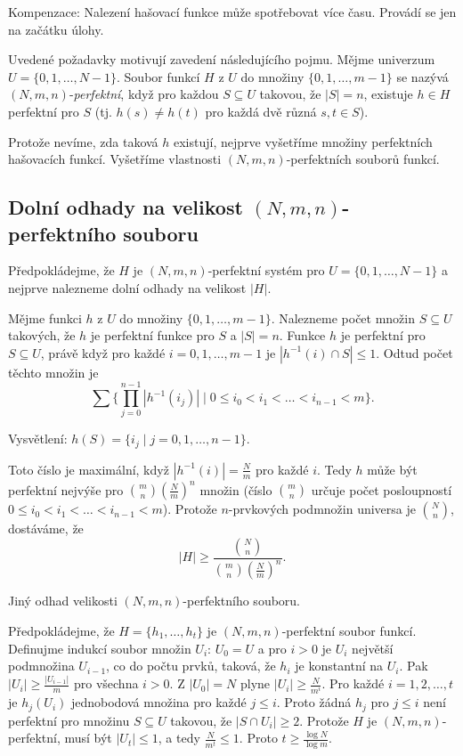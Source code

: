 \documentclass[a4paper,12pt]{article}
\begin{document}
Kompenzace: Nalezení hašovací funkce 
může spotřebovat více času. Provádí se jen na 
začátku úlohy. 

Uvedené požadavky motivují zavedení 
následujícího pojmu.\newline 
Mějme univerzum $U=\{0,1,\dots,N-1\}$. Soubor funkcí $H$ z 
$U$ do množiny $\{0,1,\dots,m-1\}$ se nazývá 
$(N,m,n)$-\emph{perfektní}, když pro každou $S\subseteq 
U$ 
takovou, že $|S|=n$, existuje $h\in H$ perfektní pro $S$ (tj. 
$h(s)\ne h(t)$ pro každá dvě různá $s,t\in S$).

Protože nevíme, zda taková $h$ existují, nejprve 
vyšetříme mno\-ži\-ny perfektních hašovacích 
funkcí. Vyšetříme vlastnosti $(N,m,n)$-perfektních 
souborů funkcí.

\subsection{
Dolní odhady na velikost $(N,m,n)$-perfektního souboru
}

Předpokládejme, že $H$  je $(N,m,n)$-perfektní 
systém pro $U=\{0,1,\dots,N-1\}$ a nejprve nalezneme dolní 
odhady na velikost $|H|$.

Mějme funkci $h$ z $U$ do množiny $\{0,1,\dots,m-
1\}$. 
Nalezneme počet množin $S\subseteq U$ takových, že  
$h$ je perfektní funkce pro $S$ a $|S|=n$. Funkce $h$ je perfektní pro 
$S\subseteq U$, právě když pro každé $i=0,1,\dots,m-
1$ je 
$|h^{-1}(i)\cap S|\le 1$. Odtud počet těchto množin je
$$\sum \{\prod_{j=0}^{n-1}|h^{-1}(i_j)|\mid 0\le i_0<i_1<\dots<i_{
n-1}<m\}.$$

Vysvětlení: $h(S)=\{i_j\mid j=0,1,\dots,n-1\}$.

Toto číslo je maximální, když $|h^{-1}(
i)|=\frac Nm$ pro každé $i$. 
Tedy $h$ může být perfektní nejvýše pro $\binom 
mn(\frac Nm)^n$ 
množin (číslo $\binom mn$ určuje počet posloupností 
$0\le i_0<i_1<\dots<i_{n-1}<m$). Protože $n$-prvkových 
podmnožin universa je $\binom Nn$, dostáváme, že 
$$|H|\ge\frac {\binom Nn}{\binom mn(\frac Nm)^n}.$$

Jiný odhad velikosti $(N,m,n)$-perfektního souboru.

Předpokládejme, že $H=\{h_1,\dots,h_t\}$ je 
$(N,m,n)$-perfektní soubor funkcí.  Definujme indukcí 
soubor množin $U_i$:\newline 
$U_0=U$ a pro 
$i>0$ je $U_i$ největší podmnožina $U_{i-1}$, co do počtu 
prvků, 
taková, že $h_i$ je konstantní na $U_i$.  Pak $|U_i|\ge\frac {
|U_{i-1}|}m$ 
pro všechna $i>0$.  Z $|U_0|=N$ plyne $|U_i|\ge\frac N{m^i}$.  Pro každé 
$i=1,2,\dots,t$ je $h_j(U_i)$ jednobodová množina pro každé 
$j\le i$.  Proto žádná $h_j$ pro $j\le i$ není perfektní pro 
množinu $S\subseteq U$ takovou, že $|S\cap U_i|\ge 2$.  Protože $
H$ je 
$(N,m,n)$-perfektní, musí být $|U_t|\le 1$, a tedy $\frac 
N{m^t}\le 1$.  Proto 
$t\ge\frac {\log N}{\log m}$.    
\end{document}
